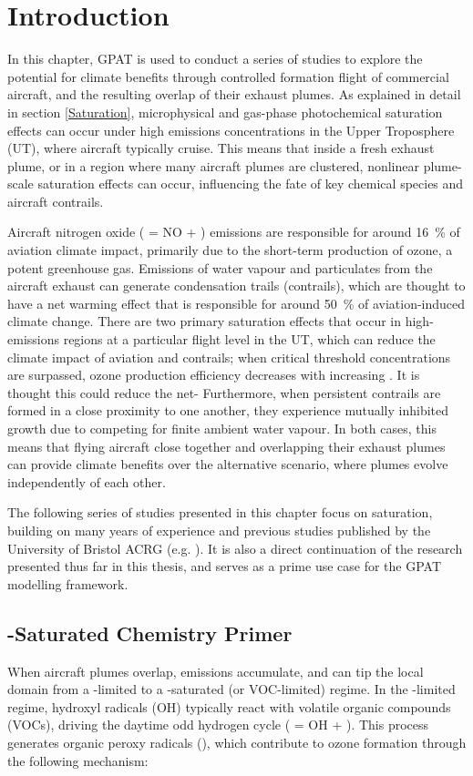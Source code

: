 \section{Introduction}
In this chapter, GPAT is used to conduct a series of studies to explore the potential for climate benefits through controlled formation flight of commercial aircraft, and the resulting overlap of their exhaust plumes. As explained in detail in section \ref{Saturation}, microphysical and gas-phase photochemical saturation effects can occur under high emissions concentrations in the Upper Troposphere (UT), where aircraft typically cruise. This means that inside a fresh exhaust plume, or in a region where many aircraft plumes are clustered, nonlinear plume-scale saturation effects can occur, influencing the fate of key chemical species and aircraft contrails. 

Aircraft nitrogen oxide ( = NO + ) emissions are responsible for around 16~\% of aviation climate impact, primarily due to the short-term production of ozone, a potent greenhouse gas. Emissions of water vapour and particulates from the aircraft exhaust can generate condensation trails (contrails), which are thought to have a net warming effect that is responsible for around 50~\% of aviation-induced climate change. There are two primary saturation effects that occur in high-emissions regions at a particular flight level in the UT, which can reduce the climate impact of aviation  and contrails; when critical  threshold concentrations are surpassed, ozone production efficiency decreases with increasing . It is thought this could reduce the net-  Furthermore, when persistent contrails are formed in a close proximity to one another, they experience mutually inhibited growth due to competing for finite ambient water vapour. In both cases, this means that flying aircraft close together and overlapping their exhaust plumes can provide climate benefits over the alternative scenario, where plumes evolve independently of each other.

The following series of studies presented in this chapter focus on  saturation, building on many years of experience and previous studies published by the University of Bristol ACRG (e.g. \cite{Derwent2024}). It is also a direct continuation of the research presented thus far in this thesis, and serves as a prime use case for the GPAT modelling framework.

\subsection{\texorpdfstring{-Saturated Chemistry Primer}{NOx-Saturated Chemistry Primer}}
When aircraft plumes overlap,  emissions accumulate, and can tip the local domain from a -limited to a -saturated (or VOC-limited) regime. In the -limited regime, hydroxyl radicals (OH) typically react with volatile organic compounds (VOCs), driving the daytime odd hydrogen cycle ( = OH + ). This process generates organic peroxy radicals (), which contribute to ozone formation through the following mechanism:

